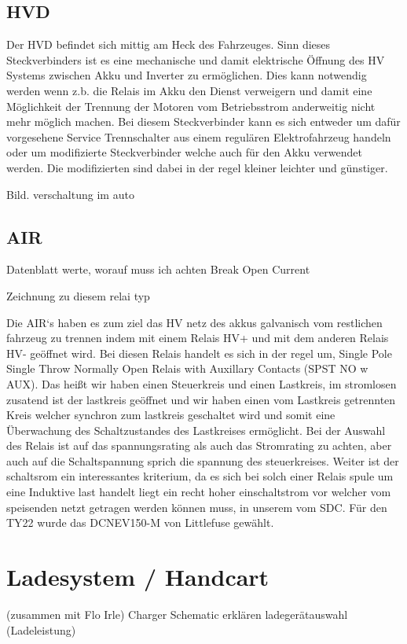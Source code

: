 \subsection{HVD}
Der HVD befindet sich mittig am Heck des Fahrzeuges. Sinn dieses Steckverbinders ist es eine mechanische und damit elektrische Öffnung des HV Systems zwischen Akku und Inverter zu ermöglichen. Dies kann notwendig werden wenn z.b. die Relais im Akku den Dienst verweigern und damit eine Möglichkeit der Trennung der Motoren vom Betriebsstrom anderweitig nicht mehr möglich machen. Bei diesem Steckverbinder kann es sich entweder um dafür vorgesehene Service Trennschalter aus einem regulären Elektrofahrzeug handeln oder um modifizierte Steckverbinder welche auch für den Akku verwendet werden. Die modifizierten sind dabei in der regel kleiner leichter und günstiger.

Bild. verschaltung im auto

\subsection{AIR}
Datenblatt werte, worauf muss ich achten
Break Open Current

Zeichnung zu diesem relai typ

Die AIR`s haben es zum ziel das HV netz des akkus galvanisch vom restlichen fahrzeug zu trennen indem mit einem Relais HV+ und mit dem anderen Relais HV- geöffnet wird. Bei diesen Relais handelt es sich in der regel um, Single Pole Single Throw Normally Open Relais with Auxillary Contacts (SPST NO w AUX). Das heißt wir haben einen Steuerkreis und einen Lastkreis, im stromlosen zusatend ist der lastkreis geöffnet und wir haben einen vom Lastkreis getrennten Kreis welcher synchron zum lastkreis geschaltet wird und somit eine Überwachung des Schaltzustandes des Lastkreises ermöglicht. 
Bei der Auswahl des Relais ist auf das spannungsrating als auch das Stromrating zu achten, aber auch auf die Schaltspannung sprich die spannung des steuerkreises. Weiter ist der schaltsrom ein interessantes kriterium, da es sich bei solch einer Relais spule um eine Induktive last handelt liegt ein recht hoher einschaltstrom vor welcher vom speisenden netzt getragen werden können muss, in unserem vom SDC. Für den TY22 wurde das DCNEV150-M von Littlefuse gewählt.

\section{Ladesystem / Handcart} (zusammen mit Flo Irle)
Charger Schematic erklären
ladegerätauswahl (Ladeleistung)

